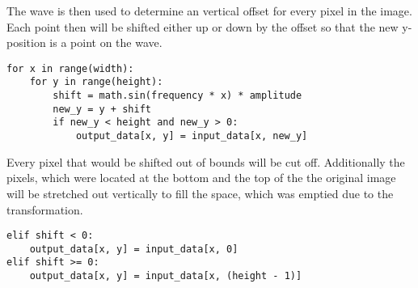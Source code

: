 The wave is then used to determine an vertical offset for every pixel in the image. Each point then will be shifted either up or down by the offset so that the new y-position is a point on the wave. 

\begin{lstlisting}[style=std]
for x in range(width):
	for y in range(height):
		shift = math.sin(frequency * x) * amplitude
		new_y = y + shift
		if new_y < height and new_y > 0:
			output_data[x, y] = input_data[x, new_y]
\end{lstlisting}

Every pixel that would be shifted out of bounds will be cut off. Additionally the pixels, which were located at the bottom and the top of the the original image will be stretched out vertically to fill the space, which was emptied due to the transformation.

\begin{lstlisting}[style=std]
elif shift < 0:
	output_data[x, y] = input_data[x, 0]
elif shift >= 0:
	output_data[x, y] = input_data[x, (height - 1)]
\end{lstlisting}

\clearpage
